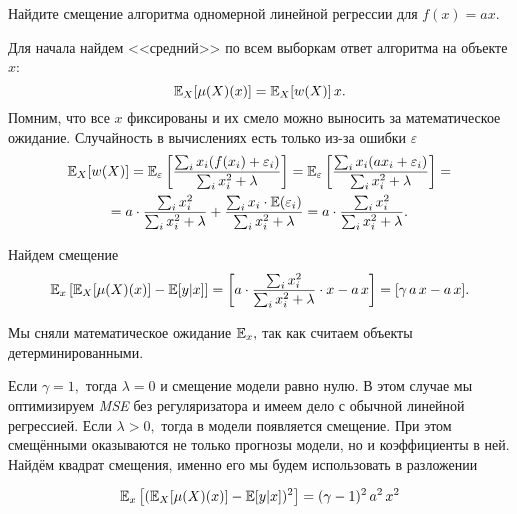 \documentclass[12pt,fleqn]{article}
\begin{document}
\begin{vkProblem}
Найдите смещение алгоритма одномерной линейной регрессии для $f(x) = ax$.
\end{vkProblem}
\begin{esSolution}
    Для начала найдем <<средний>> по всем выборкам ответ алгоритма на объекте $x$:
    \[
    \mathbb{E}_{X}[\mu(X)(x)] = \mathbb{E}_{X}[w(X)] \, x.
    \]
    Помним, что все $x$ фиксированы и их смело можно выносить за математическое ожидание. Случайность в вычислениях есть только из-за ошибки $\varepsilon$
    \begin{multline}
        \label{k_eq1}
        \EE_{X}[w(X)] = \EE_{\varepsilon} \left[\frac{\sum_i x_i (f(x_i) + \varepsilon_i)}{\sum_i x_i^2 + \lambda} \right] = \EE_{\varepsilon} \left[\frac{\sum_i x_i (ax_i + \varepsilon_i)}{\sum_i x_i^2 + \lambda} \right] = \\ =  a \cdot \frac{\sum_i x_i^2}{\sum_i x_i^2 + \lambda} + \frac{\sum_i x_i \cdot \EE(\varepsilon_i)}{\sum_i x_i^2 + \lambda} = a \cdot \frac{\sum_i x_i^2}{\sum_i x_i^2 + \lambda}.
    \end{multline}

    Найдем смещение
    \[
    \EE_{x} \left[\EE_{X}[\mu(X)(x)] - \EE[y|x]  \right] =  \left[a \cdot \frac{\sum_i x_i^2}{\sum_i x_i^2 + \lambda} \cdot x -  a\, x \right] = [\gamma\, a\, x -  a\, x ].
    \]

    Мы сняли математическое ожидание $\mathbb{E}_{x},$ так как считаем объекты детерминированными. 
    
    Если $\gamma = 1,$ тогда $\lambda = 0$ и смещение модели равно нулю. В этом случае мы оптимизируем \textit{MSE} без регуляризатора и имеем дело с обычной линейной регрессией. Если $\lambda > 0,$ тогда в модели появляется смещение. При этом смещёнными оказываются не только прогнозы модели, но и коэффициенты в ней. Найдём квадрат смещения, именно его мы будем использовать в разложении

    \[
    \mathbb{E}_{x} \left[(\mathbb{E}_{X}[\mu(X)(x)] - \mathbb{E}[y|x])^2 \right] = (\gamma - 1)^2\, a^2\, x^2
    \]
\end{esSolution}
\end{document}
